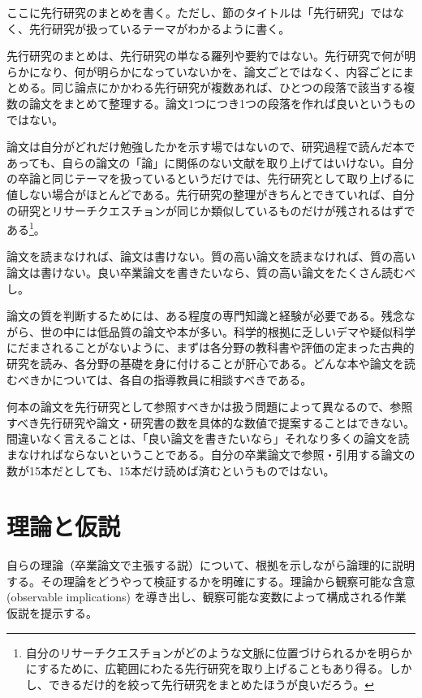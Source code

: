 \documentclass[lualatex,
               a4paper,
               10.5pt,
               ja=standard,
               jafont=ipaex]{bxjsarticle}
\begin{document}
ここに先行研究のまとめを書く。ただし、節のタイトルは「先行研究」ではなく、先行研究が扱っているテーマがわかるように書く。

先行研究のまとめは、先行研究の単なる羅列や要約ではない。先行研究で何が明らかになり、何が明らかになっていないかを、論文ごとではなく、内容ごとにまとめる。同じ論点にかかわる先行研究が複数あれば、ひとつの段落で該当する複数の論文をまとめて整理する。論文1つにつき1つの段落を作れば良いというものではない。

論文は自分がどれだけ勉強したかを示す場ではないので、研究過程で読んだ本であっても、自らの論文の「論」に関係のない文献を取り上げてはいけない。自分の卒論と同じテーマを扱っているというだけでは、先行研究として取り上げるに値しない場合がほとんどである。先行研究の整理がきちんとできていれば、自分の研究とリサーチクエスチョンが同じか類似しているものだけが残されるはずである\footnote{自分のリサーチクエスチョンがどのような文脈に位置づけられるかを明らかにするために、広範囲にわたる先行研究を取り上げることもあり得る。しかし、できるだけ的を絞って先行研究をまとめたほうが良いだろう。}。

論文を読まなければ、論文は書けない。質の高い論文を読まなければ、質の高い論文は書けない。良い卒業論文を書きたいなら、質の高い論文をたくさん読むべし。

論文の質を判断するためには、ある程度の専門知識と経験が必要である。残念ながら、世の中には低品質の論文や本が多い。科学的根拠に乏しいデマや疑似科学にだまされることがないように、まずは各分野の教科書や評価の定まった古典的研究を読み、各分野の基礎を身に付けることが肝心である。どんな本や論文を読むべきかについては、各自の指導教員に相談すべきである。

何本の論文を先行研究として参照すべきかは扱う問題によって異なるので、参照すべき先行研究や論文・研究書の数を具体的な数値で提案することはできない。間違いなく言えることは、「良い論文を書きたいなら」それなり多くの論文を読まなければならないということである。自分の卒業論文で参照・引用する論文の数が15本だとしても、15本だけ読めば済むというものではない。

\section{理論と仮説}\label{ux7406ux8ad6ux3068ux4eeeux8aac}

自らの理論（卒業論文で主張する説）について、根拠を示しながら論理的に説明する。その理論をどうやって検証するかを明確にする。理論から観察可能な含意 (observable implications) を導き出し、観察可能な変数によって構成される作業仮説を提示する。
\end{document}

